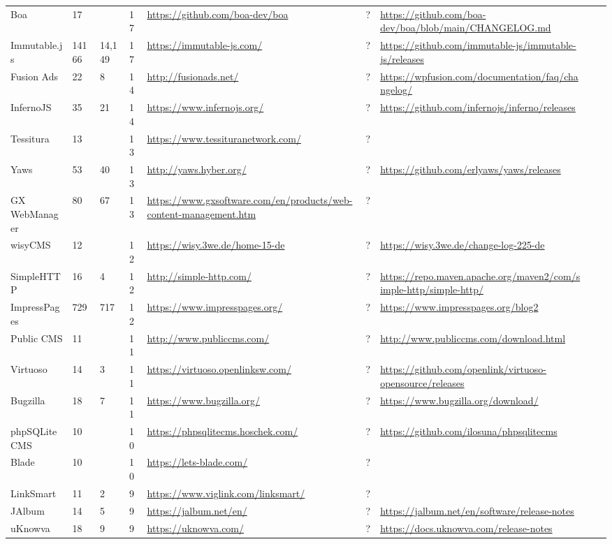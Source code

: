 \begin{table}[!htp]
\begin{tabular}{|l|l|l|l|l|l|l|l|l|}
				Boa &17 & &17 &\ul{https://github.com/boa-dev/boa} &? &\ul{https://github.com/boa-dev/boa/blob/main/CHANGELOG.md} & \\
				Immutable.js &14166 &14,149 &17 &\ul{https://immutable-js.com/} &? &\ul{https://github.com/immutable-js/immutable-js/releases} & \\
				Fusion Ads &22 &8 &14 &\ul{http://fusionads.net/} &? &\ul{https://wpfusion.com/documentation/faq/changelog/} & \\
				InfernoJS &35 &21 &14 &\ul{https://www.infernojs.org/} &? &\ul{https://github.com/infernojs/inferno/releases} & \\
				Tessitura &13 & &13 &\ul{https://www.tessituranetwork.com/} &? & & \\
				Yaws &53 &40 &13 &\ul{http://yaws.hyber.org/} &? &\ul{https://github.com/erlyaws/yaws/releases} & \\
				GX WebManager &80 &67 &13 &\ul{https://www.gxsoftware.com/en/products/web-content-management.htm} &? & & \\
				wisyCMS &12 & &12 &\ul{https://wisy.3we.de/home-15-de} &? &\ul{https://wisy.3we.de/change-log-225-de} & \\
				SimpleHTTP &16 &4 &12 &\ul{http://simple-http.com/} &? &\ul{https://repo.maven.apache.org/maven2/com/simple-http/simple-http/} & \\
				ImpressPages &729 &717 &12 &\ul{https://www.impresspages.org/} &? &\ul{https://www.impresspages.org/blog2} & \\
				Public CMS &11 & &11 &\ul{http://www.publiccms.com/} &? &\ul{http://www.publiccms.com/download.html} & \\
				Virtuoso &14 &3 &11 &\ul{https://virtuoso.openlinksw.com/} &? &\ul{https://github.com/openlink/virtuoso-opensource/releases} & \\
				Bugzilla &18 &7 &11 &\ul{https://www.bugzilla.org/} &? &\ul{https://www.bugzilla.org/download/} & \\
				phpSQLiteCMS &10 & &10 &\ul{https://phpsqlitecms.hoschek.com/} &? &\ul{https://github.com/ilosuna/phpsqlitecms} & \\
				Blade &10 & &10 &\ul{https://lets-blade.com/} &? & & \\
				LinkSmart &11 &2 &9 &\ul{https://www.viglink.com/linksmart/} &? & & \\
				JAlbum &14 &5 &9 &\ul{https://jalbum.net/en/} &? &\ul{https://jalbum.net/en/software/release-notes} & \\
				uKnowva &18 &9 &9 &\ul{https://uknowva.com/} &? &\ul{https://docs.uknowva.com/release-notes} & \\

\end{tabular}
\end{table}
